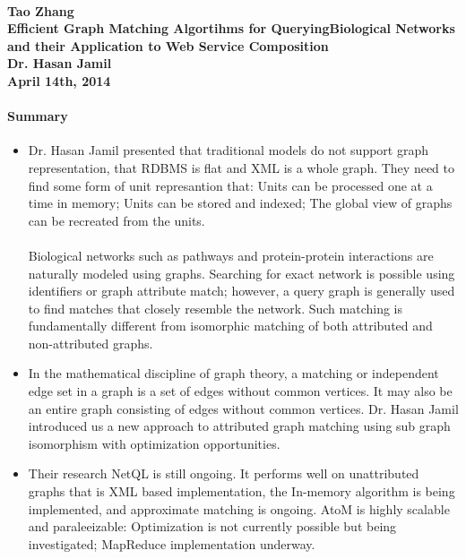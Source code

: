 \documentclass[12pt]{article}
\begin{document}
\paragraph{Tao Zhang\\Efficient Graph Matching Algortihms for QueryingBiological Networks and their Application to Web Service Composition\\Dr. Hasan Jamil\\April 14th, 2014}

\paragraph{Summary}

\begin{itemize}
\item Dr. Hasan Jamil presented that traditional models do not support graph representation, that RDBMS is flat and XML is a whole graph. They need to find some form of unit represantion that: Units can be processed one at a time in memory; Units can be stored and indexed; The global view of graphs can be recreated from the units.\\
\\
 Biological networks such as pathways and protein-protein interactions are naturally modeled using graphs. Searching for exact network is possible using identifiers or graph attribute match; however, a query graph is generally used to find matches that closely resemble the network. Such matching is fundamentally different from isomorphic matching of both attributed and non-attributed graphs. 
\item In the mathematical discipline of graph theory, a matching or independent edge set in a graph is a set of edges without common vertices. It may also be an entire graph consisting of edges without common vertices. Dr. Hasan Jamil introduced us a new approach to attributed graph matching using sub graph isomorphism with optimization opportunities.
\item Their research NetQL is still ongoing. It performs well on unattributed graphs that is XML based implementation, the In-memory algorithm is being implemented, and approximate matching is ongoing. AtoM is highly scalable and paraleeizable: Optimization is not currently possible but being investigated; MapReduce implementation underway.
\end{itemize}
\end{document}

